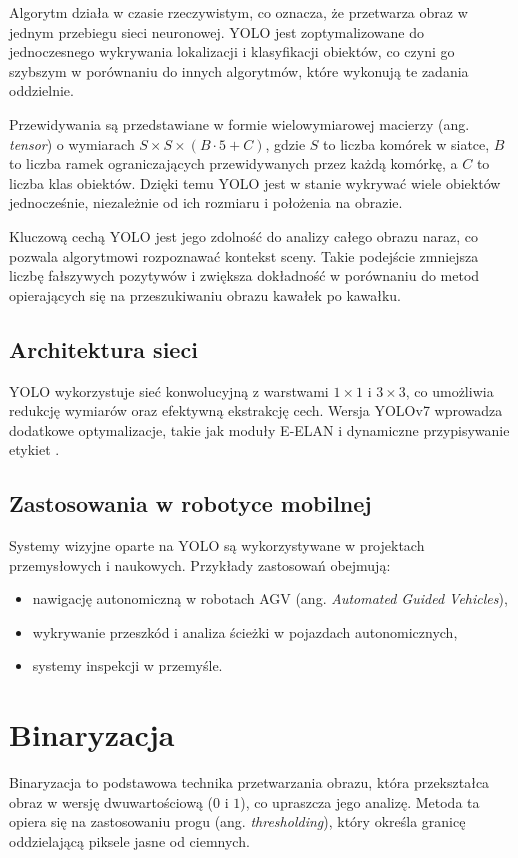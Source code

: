 \documentclass[a4paper,twoside,12pt]{book}
\begin{document}
Algorytm działa w czasie rzeczywistym, co oznacza, że przetwarza obraz w jednym przebiegu sieci neuronowej. YOLO jest zoptymalizowane do jednoczesnego wykrywania lokalizacji i klasyfikacji obiektów, co czyni go szybszym w porównaniu do innych algorytmów, które wykonują te zadania oddzielnie.

Przewidywania są przedstawiane w formie wielowymiarowej macierzy (ang. \textit{tensor}) o wymiarach \( S \times S \times (B \cdot 5 + C) \), gdzie \( S \) to liczba komórek w siatce, \( B \) to liczba ramek ograniczających przewidywanych przez każdą komórkę, a \( C \) to liczba klas obiektów. Dzięki temu YOLO jest w stanie wykrywać wiele obiektów jednocześnie, niezależnie od ich rozmiaru i położenia na obrazie.

Kluczową cechą YOLO jest jego zdolność do analizy całego obrazu naraz, co pozwala algorytmowi rozpoznawać kontekst sceny. Takie podejście zmniejsza liczbę fałszywych pozytywów i zwiększa dokładność w porównaniu do metod opierających się na przeszukiwaniu obrazu kawałek po kawałku.

\subsection{Architektura sieci}
YOLO wykorzystuje sieć konwolucyjną z warstwami \( 1 \times 1 \) i \( 3 \times 3 \), co umożliwia redukcję wymiarów oraz efektywną ekstrakcję cech. Wersja YOLOv7 wprowadza dodatkowe optymalizacje, takie jak moduły E-ELAN i dynamiczne przypisywanie etykiet \cite{bib:wang_yolov7}.

\subsection{Zastosowania w robotyce mobilnej}
Systemy wizyjne oparte na YOLO są wykorzystywane w projektach przemysłowych i naukowych. Przykłady zastosowań obejmują:
\begin{itemize}
    \item nawigację autonomiczną w robotach AGV (ang. \textit{Automated Guided Vehicles}),
    \item wykrywanie przeszkód i analiza ścieżki w pojazdach autonomicznych,
    \item systemy inspekcji w przemyśle.
\end{itemize}

\section{Binaryzacja}
Binaryzacja to podstawowa technika przetwarzania obrazu, która przekształca obraz w wersję dwuwartościową (\(0\) i \(1\)), co upraszcza jego analizę. Metoda ta opiera się na zastosowaniu progu (ang. \textit{thresholding}), który określa granicę oddzielającą piksele jasne od ciemnych.
\end{document}
